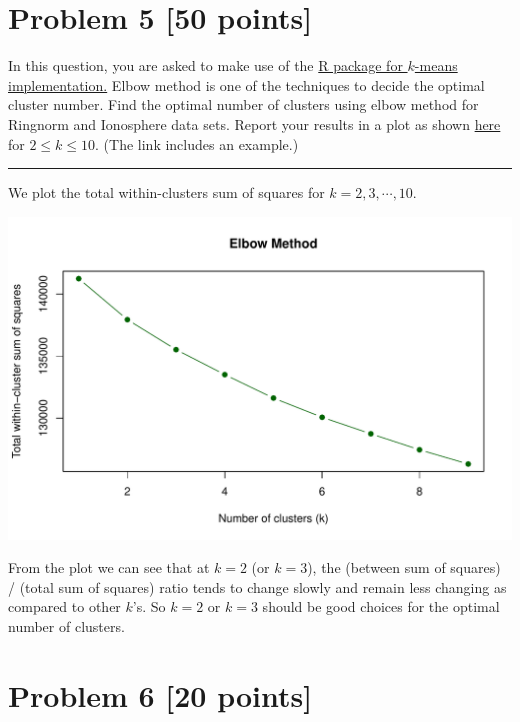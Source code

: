 \documentclass[a4paper,11pt]{article}
\newcommand{\sep}{\begin{center}\textcolor{gray}{\rule{\textwidth}{0.75pt}}\end{center}}
\begin{document}
\newpage 
 \section*{Problem 5 [50 points]} In this question, you are asked to make use of  the \href{https://stat.ethz.ch/R-manual/R-devel/library/stats/html/kmeans.html}{ R package for $k$-means implementation.} Elbow method is one of the techniques to decide the optimal cluster number.  Find the optimal number of clusters using elbow method for Ringnorm and Ionosphere data sets. Report your results in a plot as shown  \href{  https://www.r-bloggers.com/finding-optimal-number-of-clusters/}{
here} for  $2 \leq k \leq 10$. (The link includes an example.)
\sep 


We plot the total within-clusters sum of squares for $k = 2, 3, \cdots, 10$. 

\begin{center}
  \includegraphics[width=0.9\linewidth]{Image/Prob5-elbow.pdf}
\end{center}
 
From the plot we can see that at $k=2$ (or $k=3$), the (between sum of squares) / (total sum of squares) ratio tends to change slowly and remain less changing as compared to other $k$'s. So $k=2$ or $k=3$ should be good choices for the optimal number of clusters.
 
 
 
 
 
 
 
 
 
 
 
\newpage
\section*{Problem 6 [20 points]}
\end{document}
